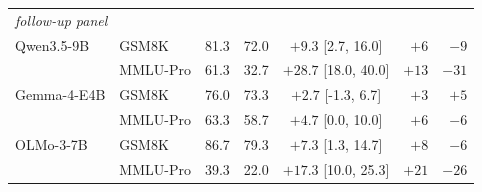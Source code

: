 \begin{tabular}{llcccrr}
\midrule
\multicolumn{7}{l}{\emph{follow-up panel}} \\
Qwen3.5-9B & GSM8K & 81.3 & 72.0 & $+9.3$ [2.7, 16.0] & $+6$ & $-9$ \\
 & MMLU-Pro & 61.3 & 32.7 & $\mathbf{+28.7}$ [18.0, 40.0] & $+13$ & $-31$ \\
Gemma-4-E4B & GSM8K & 76.0 & 73.3 & $+2.7$ [-1.3, 6.7] & $+3$ & $+5$ \\
 & MMLU-Pro & 63.3 & 58.7 & $+4.7$ [0.0, 10.0] & $+6$ & $-6$ \\
OLMo-3-7B & GSM8K & 86.7 & 79.3 & $+7.3$ [1.3, 14.7] & $+8$ & $-6$ \\
 & MMLU-Pro & 39.3 & 22.0 & $+17.3$ [10.0, 25.3] & $+21$ & $-26$ \\
\bottomrule
\end{tabular}
